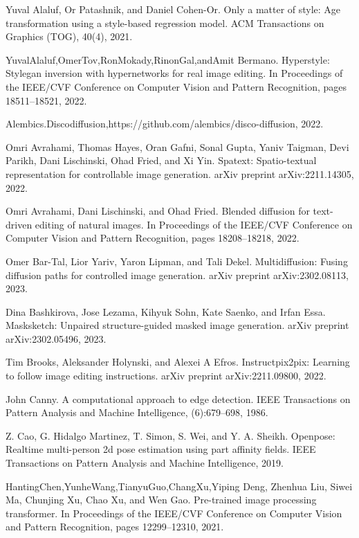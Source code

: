 \documentclass[a4paper,AutoFakeBold,oneside,12pt]{book}
\begin{document}
\begin{nopagenumber}
\noindent
[3] Yuval Alaluf, Or Patashnik, and Daniel Cohen-Or. Only a matter of style: Age transformation using a style-based regression model. ACM Transactions on Graphics (TOG), 40(4), 2021.

\noindent
[4] YuvalAlaluf,OmerTov,RonMokady,RinonGal,andAmit Bermano. Hyperstyle: Stylegan inversion with hypernetworks for real image editing. In Proceedings of the IEEE/CVF Conference on Computer Vision and Pattern Recognition, pages 18511–18521, 2022.

\noindent
[5] Alembics.Discodiffusion,https://github.com/alembics/disco-diffusion, 2022.

\noindent
[6] Omri Avrahami, Thomas Hayes, Oran Gafni, Sonal Gupta, Yaniv Taigman, Devi Parikh, Dani Lischinski, Ohad Fried, and Xi Yin. Spatext: Spatio-textual representation for controllable image generation. arXiv preprint arXiv:2211.14305, 2022.

\noindent
[7] Omri Avrahami, Dani Lischinski, and Ohad Fried. Blended diffusion for text-driven editing of natural images. In Proceedings of the IEEE/CVF Conference on Computer Vision and Pattern Recognition, pages 18208–18218, 2022.

\noindent
[8] Omer Bar-Tal, Lior Yariv, Yaron Lipman, and Tali Dekel. Multidiffusion: Fusing diffusion paths for controlled image generation. arXiv preprint arXiv:2302.08113, 2023.

\noindent
[9] Dina Bashkirova, Jose Lezama, Kihyuk Sohn, Kate Saenko, and Irfan Essa. Masksketch: Unpaired structure-guided masked image generation. arXiv preprint arXiv:2302.05496, 2023.

\noindent
[10] Tim Brooks, Aleksander Holynski, and Alexei A Efros. Instructpix2pix: Learning to follow image editing instructions. arXiv preprint arXiv:2211.09800, 2022.

\noindent
[11] John Canny. A computational approach to edge detection. IEEE Transactions on Pattern Analysis and Machine Intelligence, (6):679–698, 1986.

\noindent
[12] Z. Cao, G. Hidalgo Martinez, T. Simon, S. Wei, and Y. A. Sheikh. Openpose: Realtime multi-person 2d pose estimation using part affinity fields. IEEE Transactions on Pattern Analysis and Machine Intelligence, 2019.

\noindent
[13] HantingChen,YunheWang,TianyuGuo,ChangXu,Yiping Deng, Zhenhua Liu, Siwei Ma, Chunjing Xu, Chao Xu, and Wen Gao. Pre-trained image processing transformer. In Proceedings of the IEEE/CVF Conference on Computer Vision and Pattern Recognition, pages 12299–12310, 2021.


\end{nopagenumber}
\end{document}
